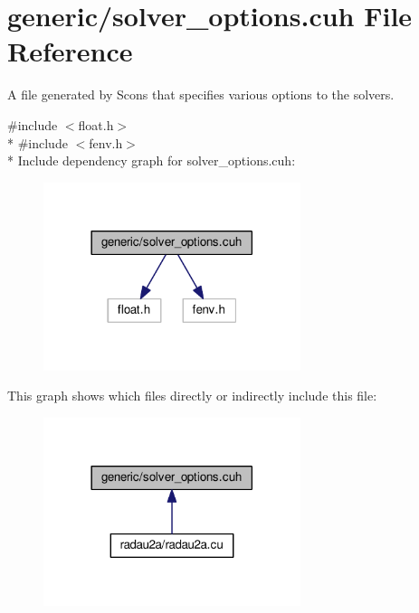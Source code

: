 \hypertarget{solver__options_8cuh}{}\section{generic/solver\+\_\+options.cuh File Reference}
\label{solver__options_8cuh}


A file generated by Scons that specifies various options to the solvers.  


{\ttfamily \#include $<$float.\+h$>$}\\*
{\ttfamily \#include $<$fenv.\+h$>$}\\*
Include dependency graph for solver\+\_\+options.\+cuh\+:\nopagebreak
\begin{figure}[H]
\begin{center}
\leavevmode
\includegraphics[width=213pt]{solver__options_8cuh__incl}
\end{center}
\end{figure}
This graph shows which files directly or indirectly include this file\+:\nopagebreak
\begin{figure}[H]
\begin{center}
\leavevmode
\includegraphics[width=213pt]{solver__options_8cuh__dep__incl}
\end{center}
\end{figure}
